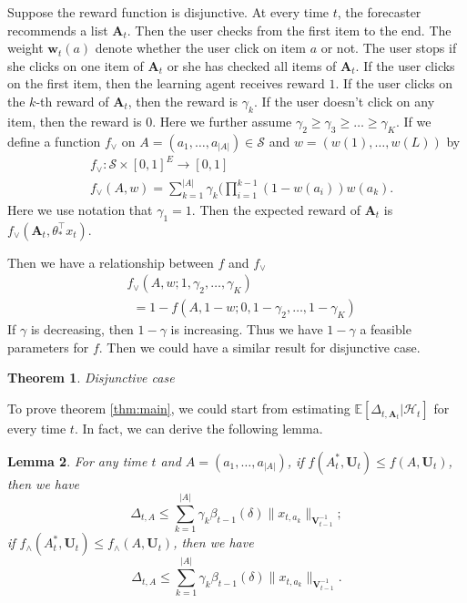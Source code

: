 \documentclass{article}
\newcommand{\EE}{\mathbb{E}}
\newcommand{\bA}{\mathbf{A}}
\newcommand{\bU}{\mathbf{U}}
\newcommand{\bV}{\mathbf{V}}
\newcommand{\bw}{\mathbf{w}}
\newcommand{\cH}{\mathcal{H}}
\newcommand{\cS}{\mathcal{S}}
\newcommand{\abs}[1]{\left| #1 \right|}
\newcommand{\norm}[1]{\| #1 \|}
\newtheorem{theorem}{Theorem}[section]
\newtheorem{lemma}[theorem]{Lemma}%
\begin{document}
Suppose the reward function is disjunctive. At every time $t$, the forecaster recommends a list $\bA_t$. Then the user checks from the first item to the end. The weight $\bw_t(a)$ denote whether the user click on item $a$ or not. The user stops if she clicks on one item of $\bA_t$ or she has checked all items of $\bA_t$. If the user clicks on the first item, then the learning agent receives reward $1$. If the user clicks on the $k$-th reward of $\bA_t$, then the reward is $\gamma_k$. If the user doesn't click on any item, then the reward is $0$. Here we further assume $\gamma_2 \geq \gamma_3 \geq \ldots \geq \gamma_K$. If we define a function $f_{\vee}$ on $A = (a_1, \ldots, a_{\abs{A}}) \in \cS$ and $w = (w(1), \ldots, w(L))$ by
\begin{align*}
&f_{\vee} : \cS \times [0,1]^E \to [0,1]\\
&f_{\vee}(A,w) = \sum_{k=1}^{\abs{A}}\gamma_k (\prod_{i=1}^{k-1} (1 - w(a_i)) w(a_k).
\end{align*}
Here we use notation that $\gamma_1 = 1$. Then the expected reward of $\bA_t$ is $f_{\vee}(\bA_t, \theta_*^{\top}x_t)$.

Then we have a relationship between $f$ and $f_{\vee}$
\begin{equation}
\label{eq:relation}
\begin{split}
&f_{\vee}(A, w; 1, \gamma_2, \ldots, \gamma_K) \\
&~~= 1 - f(A, 1 - w; 0, 1-\gamma_2, \ldots, 1-\gamma_K)
\end{split}
\end{equation}
If $\gamma$ is decreasing, then $1 - \gamma$ is increasing. Thus we have $1 - \gamma$ a feasible parameters for $f$. Then we could have a similar result for disjunctive case.
\begin{theorem}
Disjunctive case
\end{theorem}

To prove theorem \ref{thm:main}, we could start from estimating $\EE[\Delta_{t, \bA_t}|\cH_t]$ for every time $t$. In fact, we can derive the following lemma.
\begin{lemma}
\label{lem:DeltaEstimate}
For any time $t$ and $A = (a_1, \ldots, a_{\abs{A}})$, if $f(A_t^*, \bU_t) \leq f(A, \bU_t)$, then we have
$$
\Delta_{t,A} \leq \sum_{k=1}^{\abs{A}} \gamma_k \beta_{t-1}(\delta)\norm{x_{t,a_k}}_{\bV_{t-1}^{-1}};
$$
if $f_{\wedge}(A_t^*, \bU_t) \leq f_{\wedge}(A, \bU_t)$, then we have
$$
\Delta_{t,A} \leq \sum_{k=1}^{\abs{A}} \gamma_k \beta_{t-1}(\delta)\norm{x_{t,a_k}}_{\bV_{t-1}^{-1}}.
$$
\end{lemma}
\end{document}
